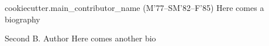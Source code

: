 \begin{IEEEbiography}{ {{cookiecutter.main_contributor_name}}  } (M'77--SM'82--F'85) Here comes a biography
\end{IEEEbiography}

\begin{IEEEbiography}{Second B. Author} Here comes another bio
\end{IEEEbiography}
